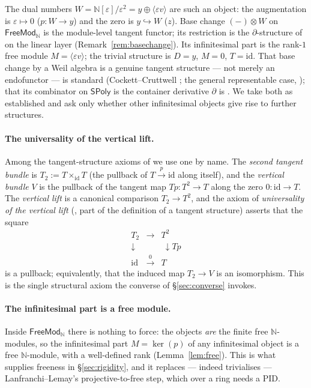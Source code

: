 \documentclass[11pt]{article}
\theoremstyle{definition}
\newcommand{\SPoly}{\mathsf{SPoly}}
\newcommand{\FreeMod}{\mathsf{FreeMod}}
\newcommand{\N}{\mathbb{N}}
\newcommand{\id}{\mathrm{id}}
\renewcommand{\ker}{\operatorname{ker}}
\begin{document}
The dual numbers $W=\N[\varepsilon]/\varepsilon^2=y\oplus\langle\varepsilon v\rangle$ are such an
object: the augmentation is $\varepsilon\mapsto0$ ($p\colon W\to y$) and the zero is
$y\hookrightarrow W$ ($z$). Base change $(-)\otimes W$ on $\FreeMod_\N$ is the module-level tangent
functor; its restriction is the $\partial$-structure of \cite{MacBethTangent} on the linear layer
(Remark~\ref{rem:basechange}). Its infinitesimal part is the rank-$1$ free module
$M=\langle\varepsilon v\rangle$; the trivial structure is $D=y$, $M=0$, $T=\id$. That base change by
a Weil algebra is a genuine tangent structure --- not merely an endofunctor --- is standard
(Cockett--Cruttwell \cite{CockettCruttwell2014}; the general representable case,
\cite{LanfranchiLemay2025}); that its combinator on $\SPoly$ is the container derivative $\partial$
is \cite{MacBethTangent}. We take both as established and ask only whether other infinitesimal
objects give rise to further structures.

\paragraph{The universality of the vertical lift.}
Among the tangent-structure axioms of \cite{CockettCruttwell2014} we use one by name. The
\emph{second tangent bundle} is $T_2:=T\times_{\id}T$ (the pullback of $T\xrightarrow{p}\id$ along
itself), and the \emph{vertical bundle} $V$ is the pullback of the tangent map
$Tp\colon T^2\to T$ along the zero $0\colon\id\to T$. The \emph{vertical lift} is a canonical
comparison $T_2\to T^2$, and the axiom of \emph{universality of the vertical lift}
(\cite{CockettCruttwell2014}, part of the definition of a tangent structure) asserts that the
square
\[
\begin{array}{ccc}
T_2 & \longrightarrow & T^2\\[-2pt]
\downarrow & & \ \downarrow{\scriptstyle Tp}\\[-2pt]
\id & \xrightarrow{\ 0\ } & T
\end{array}
\]
is a pullback; equivalently, that the induced map $T_2\to V$ is an isomorphism. This is the single
structural axiom the converse of \S\ref{sec:converse} invokes.

\paragraph{The infinitesimal part is a free module.}
Inside $\FreeMod_\N$ there is nothing to force: the objects \emph{are} the finite free $\N$-modules,
so the infinitesimal part $M=\ker(p)$ of any infinitesimal object is a free $\N$-module, with a
well-defined rank (Lemma~\ref{lem:free}). This is what supplies freeness in \S\ref{sec:rigidity}, and
it replaces --- indeed trivialises --- Lanfranchi--Lemay's projective-to-free step, which over a ring
needs a PID.
\end{document}
